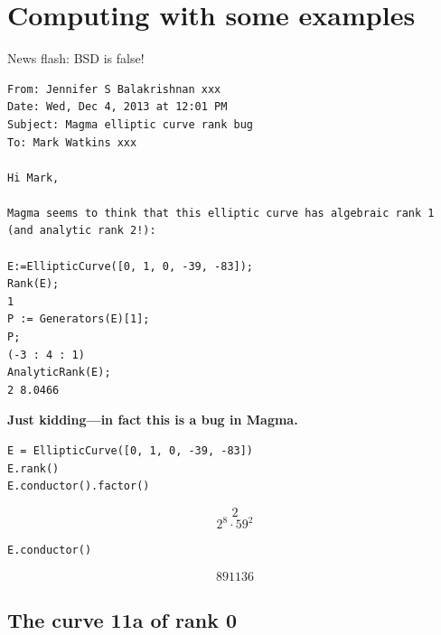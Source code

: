 \documentclass{book}
\begin{document}
\section{Computing with some examples}


{News flash: BSD is false!}
\begin{lstlisting}
From: Jennifer S Balakrishnan xxx
Date: Wed, Dec 4, 2013 at 12:01 PM
Subject: Magma elliptic curve rank bug
To: Mark Watkins xxx

Hi Mark,

Magma seems to think that this elliptic curve has algebraic rank 1
(and analytic rank 2!):

E:=EllipticCurve([0, 1, 0, -39, -83]);
Rank(E);
1
P := Generators(E)[1];
P;
(-3 : 4 : 1)
AnalyticRank(E);
2 8.0466
\end{lstlisting}

{\bf Just kidding---in fact this is a bug in Magma.}

\begin{lstlisting}
E = EllipticCurve([0, 1, 0, -39, -83])
E.rank()
E.conductor().factor()
\end{lstlisting}$$2$$$$2^{8} \cdot 59^{2}$$
\begin{lstlisting}
E.conductor()
\end{lstlisting}$$891136$$

\subsection{The curve 11a of rank 0}
\end{document}
